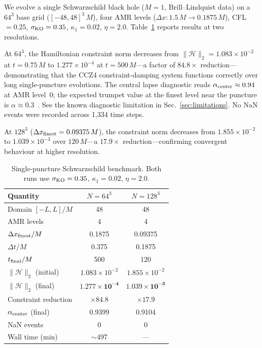 \documentclass[aps,prd,twocolumn,superscriptaddress,nofootinbib,showpacs,
               longbibliography]{revtex4-2}
\newcommand{\norm}[1]{\|#1\|}
\begin{document}
We evolve a single Schwarzschild black hole ($M = 1$, Brill--Lindquist data)
on a $64^3$ base grid ($[-48, 48]^3\,M$), four AMR levels
($\Delta x: 1.5\,M \to 0.1875\,M$), CFL $= 0.25$, $\sigma_{\rm KO} = 0.35$,
$\kappa_1 = 0.02$, $\eta = 2.0$.
Table~\ref{tab:sp} reports results at two resolutions.

At $64^3$, the Hamiltonian constraint norm decreases from
$\norm{\mathcal{H}}_2 = 1.083\times10^{-2}$ at $t = 0.75\,M$ to
$1.277\times10^{-4}$ at $t = 500\,M$---a factor of $\mathbf{84.8\times}$
reduction---demonstrating that the CCZ4 constraint-damping system functions
correctly over long single-puncture evolutions.
The central lapse diagnostic reads $\alpha_{\rm center} \approx 0.94$
at AMR level~0; the expected trumpet value at the finest level near
the puncture is $\alpha \approx 0.3$~\cite{Campanelli2006}.
See the known diagnostic limitation in Sec.~\ref{sec:limitations}.
No NaN events were recorded across 1{,}334 time steps.

At $128^3$ ($\Delta x_{\rm finest} = 0.09375\,M$), the constraint norm
decreases from $1.855\times10^{-2}$ to $1.039\times10^{-3}$ over
$120\,M$---a $17.9\times$ reduction---confirming convergent behaviour at
higher resolution.

\begin{table}[t]
\caption{Single-puncture Schwarzschild benchmark.
  Both runs use $\sigma_{\rm KO} = 0.35$, $\kappa_1 = 0.02$, $\eta = 2.0$.}
\label{tab:sp}
\begin{ruledtabular}
\begin{tabular}{lcc}
  Quantity & $N = 64^3$ & $N = 128^3$ \\ \hline
  Domain $[-L, L]/M$ & 48 & 48 \\
  AMR levels & 4 & 4 \\
  $\Delta x_{\rm finest}/M$ & 0.1875 & 0.09375 \\
  $\Delta t/M$ & 0.375 & 0.1875 \\
  $t_{\rm final}/M$ & 500 & 120 \\
  $\norm{\mathcal{H}}_2$ (initial) & $1.083\times10^{-2}$ & $1.855\times10^{-2}$ \\
  $\norm{\mathcal{H}}_2$ (final) & $\mathbf{1.277\times10^{-4}}$ & $\mathbf{1.039\times10^{-3}}$ \\
  Constraint reduction & $\times84.8$ & $\times17.9$ \\
  $\alpha_{\rm center}$ (final) & 0.9399 & 0.9104 \\
  NaN events & 0 & 0 \\
  Wall time (min) & $\sim$497 & --- \\
\end{tabular}
\end{ruledtabular}
\end{table}
\end{document}
